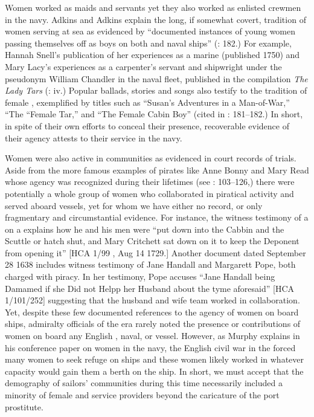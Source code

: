   Women worked as maids and servants yet they also worked as enlisted crewmen in the navy. Adkins and Adkins explain the long, if somewhat covert, tradition of women serving at sea as evidenced by “documented instances of young women passing themselves off as boys on both  and naval ships” (\citeyear*{AdkinsAdkins2008}: 182.) For example, Hannah Snell’s publication of her experiences as a marine (published 1750) and Mary Lacy’s experiences as a carpenter’s servant and shipwright under the pseudonym William Chandler in the naval fleet, published in the compilation \textit{The Lady Tars} (\citealt{SnellEtAl2008}: iv.) Popular ballads, stories and songs also testify to the tradition of female , exemplified by titles such as “Susan’s Adventures in a Man-of-War,” “The “Female Tar,” and “The Female Cabin Boy” (cited in \citealt{AdkinsAdkins2008}: 181--182.) In short, in spite of their own efforts to conceal their presence, recoverable evidence of their agency attests to their service in the navy. 

Women were also active in  communities as evidenced in court records of trials. Aside from the more famous examples of pirates like Anne Bonny and Mary Read whose agency was recognized during their lifetimes (see \citealt{Rediker2004}: 103--126,) there were potentially a whole group of women who collaborated in piratical activity and served aboard  vessels, yet for whom we have either no record, or only fragmentary and circumstantial evidence. For instance, the witness testimony of a  on a  explains how he and his men were “put down into the Cabbin and the Scuttle or hatch shut, and Mary Critchett sat down on it to keep the Deponent from opening it” [HCA 1/99 , Aug 14 1729.] Another document dated September 28 1638 includes witness testimony of Jane Handall and Margarett Pope, both charged with piracy. In her testimony, Pope accuses “Jane Handall being Damamed if she Did not Helpp her Husband about the tyme aforesaid” [HCA 1/101/252] suggesting that the husband and wife team worked in collaboration. Yet, despite these few documented references to the agency of women on board  ships, admiralty officials of the era rarely noted the presence or contributions of women on board any English , naval, or  vessel. However, as Murphy explains in his \citeyear*{Murphy2015} conference paper on women in the navy, the English civil war in the  forced many women to seek refuge on ships and these women likely worked in whatever capacity would gain them a berth on the ship. In short, we must accept that the demography of sailors’ communities during this time necessarily included a minority of female  and service providers beyond the caricature of the port prostitute. 

